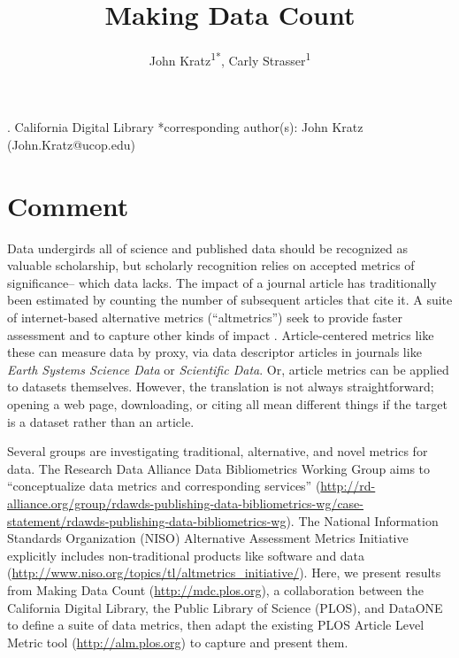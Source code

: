 \documentclass[english]{article}
\begin{document}
\title{Making Data Count}


\author{John Kratz\textsuperscript{1{*}}, Carly Strasser\textsuperscript{1}}

. California Digital Library 
{*}corresponding author(s): John Kratz (John.Kratz@ucop.edu)


\section*{Comment}


Data undergirds all of science and published data should be recognized as valuable scholarship, but scholarly recognition relies on accepted metrics of significance-- which data lacks.
The impact of a journal article has traditionally been estimated by counting the number of subsequent articles that cite it. 
A suite of internet-based alternative metrics (``altmetrics'') seek to provide faster assessment and to capture other kinds of impact \cite{priem_altmetrics_2012}.
Article-centered metrics like these can measure data by proxy, via data descriptor articles in journals like \textit{Earth Systems Science Data} or \textit{Scientific Data}\cite{pfeiffenberger_earth_2011, editors_more_2014}.
Or, article metrics can be applied to datasets themselves.
However, the translation is not always straightforward; opening a web page, downloading, or citing all mean different things if the target is a dataset rather than an article.

Several groups are investigating traditional, alternative, and novel metrics for data. 
The Research Data Alliance Data Bibliometrics Working Group aims to ``conceptualize data metrics and corresponding services'' (\url{http://rd-alliance.org/group/rdawds-publishing-data-bibliometrics-wg/case-statement/rdawds-publishing-data-bibliometrics-wg}{}). 
The National Information Standards Organization (NISO) Alternative Assessment Metrics Initiative explicitly includes non-traditional products like software and data (\url{http://www.niso.org/topics/tl/altmetrics_initiative/}).  
Here, we present results from Making Data Count (\url{http://mdc.plos.org}), a collaboration between the California Digital Library, the Public Library of Science (PLOS), and DataONE to define a suite of data metrics, then adapt the existing PLOS Article Level Metric tool (\url{http://alm.plos.org}) to capture and present them.
\end{document}
